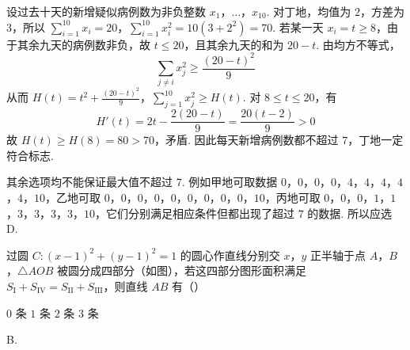 \begin{solution}
设过去十天的新增疑似病例数为非负整数 \(x_1\)，\(\ldots\)，\(x_{10}\). 对丁地，均值为 \(2\)，方差为 \(3\)，所以
\(\sum_{i=1}^{10}x_i=20\)，\(\sum_{i=1}^{10}x_i^2=10(3+2^2)=70\).
若某一天 \(x_i=t\geqslant8\)，由于其余九天的病例数非负，故 \(t\leqslant20\)，且其余九天的和为 \(20-t\). 由均方不等式，
\[
\sum_{j\ne i}x_j^2\geqslant\frac{(20-t)^2}{9}
\]
从而
\(H(t)=t^2+\frac{(20-t)^2}{9}\)，\(\sum_{j=1}^{10}x_j^2\geqslant H(t)\).
对 \(8\leqslant t\leqslant20\)，有
\[
H'(t)=2t-\frac{2(20-t)}9=\frac{20(t-2)}9>0
\]
故 \(H(t)\geqslant H(8)=80>70\)，矛盾. 因此每天新增病例数都不超过 \(7\)，丁地一定符合标志.

其余选项均不能保证最大值不超过 \(7\). 例如甲地可取数据 \(0\)，\(0\)，\(0\)，\(0\)，\(4\)，\(4\)，\(4\)，\(4\)，\(4\)，\(10\)，乙地可取 \(0\)，\(0\)，\(0\)，\(0\)，\(0\)，\(0\)，\(0\)，\(0\)，\(0\)，\(10\)，丙地可取 \(0\)，\(0\)，\(0\)，\(1\)，\(1\)，\(3\)，\(3\)，\(3\)，\(3\)，\(10\)，它们分别满足相应条件但都出现了超过 \(7\) 的数据. 所以应选 D.
\end{solution}

\begin{problem}
过圆 \(C: (x - 1)^2 + (y - 1)^2 = 1\) 的圆心作直线分别交 \(x\)，\(y\) 正半轴于点 \(A\)，\(B\)，\(\triangle AOB\) 被圆分成四部分（如图），若这四部分图形面积满足 \(S_{\mathrm I} + S_{\mathrm{IV}} = S_{\mathrm{II}} + S_{\mathrm{III}}\)，则直线 \(AB\) 有（\quad）


\choices
    {\(0\) 条}
    {\(1\) 条}
    {\(2\) 条}
    {\(3\) 条}
\end{problem}

\begin{answer}
B.
\end{answer}


